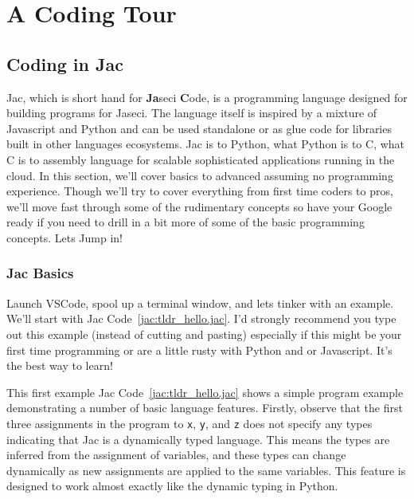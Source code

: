 \chapter{A Coding Tour}
\minitoc


\section{Coding in Jac}

Jac, which is short hand for \textbf{Ja}seci \textbf{C}ode,  is a programming language designed for building programs for Jaseci. The language itself is inspired by a mixture of Javascript and Python and can be used standalone or as glue code for libraries built in other languages ecosystems. Jac is to Python, what Python is to C, what C is to assembly language for scalable sophisticated applications running in the cloud. In this section, we'll cover basics to advanced assuming no programming experience. Though we'll try to cover everything from first time coders to pros, we'll move fast through some of the rudimentary concepts so have your Google ready if you need to drill in a bit more of some of the basic programming concepts. Lets Jump in!

\subsection{Jac Basics}

Launch VSCode, spool up a terminal window, and lets tinker with an example. We'll start with Jac Code~\ref{jac:tldr_hello.jac}. I'd strongly recommend you type out this example (instead of cutting and pasting) especially if this might be your first time programming or are a little rusty with Python and or Javascript. It's the best way to learn!

\par
{}

This first example Jac Code~\ref{jac:tldr_hello.jac} shows a simple program example demonstrating a number of basic language features. Firstly, observe that the first three assignments in the program to \texttt{x}, \texttt{y}, and \texttt{z} does not specify any types indicating that Jac is a \gls{dynamically typed language}. This means the types are inferred from the assignment of variables, and these types can change dynamically as new assignments are applied to the same variables. This feature is designed to work almost exactly like the dynamic typing in Python.

